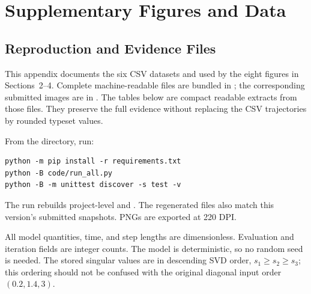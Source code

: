 
\section{Supplementary Figures and Data}
\label{sec:appendix_c}

\subsection{Reproduction and Evidence Files}
This appendix documents the six CSV datasets and 
used by the eight figures in Sections~2--4. Complete machine-readable
files are bundled in ; the corresponding submitted
images are in . The tables below are compact
readable extracts from those files. They preserve the full evidence
without replacing the CSV trajectories by rounded typeset values.

From the  directory, run:
\begin{lstlisting}
python -m pip install -r requirements.txt
python -B code/run_all.py
python -B -m unittest discover -s test -v
\end{lstlisting}
The run rebuilds project-level  and .
The regenerated files also match this version's submitted
snapshots. PNGs are exported at 220 DPI.

All model quantities, time, and step lengths are dimensionless.
Evaluation and iteration fields are integer counts.
The model is deterministic, so no random seed is needed.
The stored singular values are in descending SVD order,
$s_1\geq s_2\geq s_3$; this ordering should not be confused with
the original diagonal input order $(0.2,1.4,3)$.

